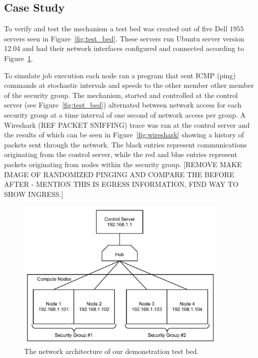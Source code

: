 \documentclass[oneside,12pt]{memoir}
\begin{document}
\subsection{Case Study}
To verify and test the mechanism a test bed was created out of five Dell $1955$ servers seen in Figure~\ref{fig:test_bed}. These servers run Ubuntu server version 12.04 and had their network interfaces configured and connected according to Figure~\ref{fig:tdm_demo_setup}. 

To simulate job execution each node ran a program that sent ICMP (ping) commands at stochastic intervals and speeds to the other member other member of the security group. The mechanism, started and controlled at the control server (see Figure~\ref{fig:test_bed}) alternated between network access for each security group at a time interval of one second of network access per group. A Wireshark (REF PACKET SNIFFING) trace was ran at the control server and the results of which can be seen in Figure~\ref{fig:wireshark} showing a history of packets sent through the network. The black entries represent communications originating from the control server, while the red and blue entries represent packets originating from nodes within the security group. [REMOVE MAKE IMAGE OF RANDOMIZED PINGING AND COMPARE THE BEFORE AFTER - MENTION THIS IS EGRESS INFORMATION, FIND WAY TO SHOW INGRESS.]
\begin{figure}
  \begin{center}
    \includegraphics[width=0.9\textwidth]{tdm_demo_setup.pdf}
  \end{center}
  \caption{The network architecture of our demonstration test bed.}
\label{fig:tdm_demo_setup}
\end{figure}
\end{document}
